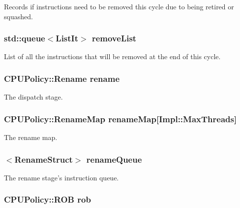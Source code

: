 \label{classFullO3CPU_a2825a91132fe292d64dca3c61fd07410}
Records if instructions need to be removed this cycle due to being retired or squashed. \hypertarget{classFullO3CPU_a574cb1bed7660bb2bb6940365f6a3315}{
\subsubsection[{removeList}]{\setlength{\rightskip}{0pt plus 5cm}std::queue$<${\bf ListIt}$>$ {\bf removeList}}}
\label{classFullO3CPU_a574cb1bed7660bb2bb6940365f6a3315}
List of all the instructions that will be removed at the end of this cycle. \hypertarget{classFullO3CPU_a39ad9a464eaaff03051506711d40fc5f}{
\subsubsection[{rename}]{\setlength{\rightskip}{0pt plus 5cm}CPUPolicy::Rename {\bf rename}}}
\label{classFullO3CPU_a39ad9a464eaaff03051506711d40fc5f}
The dispatch stage. \hypertarget{classFullO3CPU_a777805217a21e32ee39d1203bca3da53}{
\subsubsection[{renameMap}]{\setlength{\rightskip}{0pt plus 5cm}CPUPolicy::RenameMap {\bf renameMap}\mbox{[}Impl::MaxThreads\mbox{]}}}
\label{classFullO3CPU_a777805217a21e32ee39d1203bca3da53}
The rename map. \hypertarget{classFullO3CPU_ae590391fe7915c744cde571b7d15d893}{
\subsubsection[{renameQueue}]{$<${\bf RenameStruct}$>$ {\bf renameQueue}}}
\label{classFullO3CPU_ae590391fe7915c744cde571b7d15d893}
The rename stage's instruction queue. \hypertarget{classFullO3CPU_ad649787f87175a89806eeccaee4832e9}{
\subsubsection[{rob}]{\setlength{\rightskip}{0pt plus 5cm}CPUPolicy::ROB {\bf rob}}}
